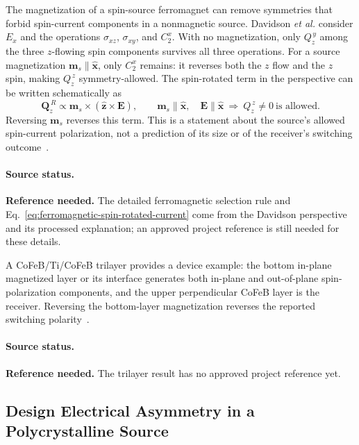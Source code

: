 The magnetization of a spin-source ferromagnet can remove symmetries that
forbid spin-current components in a nonmagnetic source.  Davidson \emph{et al.}
consider $E_x$ and the operations $\sigma_{xz}$, $\sigma_{xy}$, and $C_2^x$.
With no magnetization, only $Q_z^{\,y}$ among the three $z$-flowing spin
components survives all three operations.  For a source magnetization
$\mathbf m_s\parallel\hat{\mathbf x}$, only $C_2^x$ remains: it reverses both
the $z$ flow and the $z$ spin, making $Q_z^{\,z}$ symmetry-allowed.  The
spin-rotated term in the perspective can be written schematically as
\begin{equation}
    \mathbf Q_z^{\,R}\propto
    \mathbf m_s\times(\hat{\mathbf z}\times\mathbf E),
    \qquad
    \mathbf m_s\parallel\hat{\mathbf x},\quad
    \mathbf E\parallel\hat{\mathbf x}
    \ \Longrightarrow\ Q_z^{\,z}\ne 0\ \text{is allowed}.
    \label{eq:ferromagnetic-spin-rotated-current}
\end{equation}
Reversing $\mathbf m_s$ reverses this term.  This is a statement about the
source's allowed spin-current polarization, not a prediction of its size or of
the receiver's switching outcome~\cite{davidson2020spin-currents}.

\paragraph{Source status.}
\textbf{Reference needed.}  The detailed ferromagnetic selection rule and
Eq.~\eqref{eq:ferromagnetic-spin-rotated-current} come from the Davidson
perspective and its processed explanation; an approved project reference is
still needed for these details.

A CoFeB/Ti/CoFeB trilayer provides a device example: the bottom in-plane
magnetized layer or its interface generates both in-plane and out-of-plane
spin-polarization components, and the upper perpendicular CoFeB layer is the
receiver.  Reversing the bottom-layer magnetization reverses the reported
switching polarity~\cite{yang2024ferromagnetic-trilayer}.

\paragraph{Source status.}
\textbf{Reference needed.}  The trilayer result has no approved project
reference yet.

\subsection{Design Electrical Asymmetry in a Polycrystalline Source}

